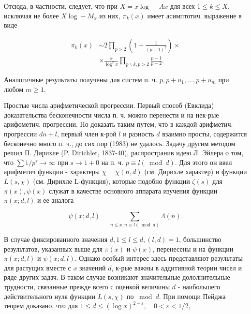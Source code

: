 \documentclass[10pt]{article}
\begin{document}
Отсюда, в частности, следует, что при $X=x \log -A x$ для всех $1 \leqslant k \leqslant X$, исключая не более $X \log -M_{x}$ из них, $\pi_{k}(x)$ имеет асимптотич. выражение в виде



\[

\begin{aligned}

\pi_{k}(x) & \sim 2 \prod_{p>2}\left(1-\frac{1}{(p-1)^{2}}\right) \times \\

& \times \frac{x}{\log ^{2} x} \prod_{p \backslash k, p>2} \frac{p-1}{p-2} .

\end{aligned}

\]



Аналогичные результаты получены для систем п. ч. $p, p+u_{1}, \ldots, p+u_{m}$ при любом $m \geqslant 1$.



Простые числа арифметической прогрессии. Первый способ (Евклида) доказательства бесконечности числа п. ч. можно перенести и на нек-рые арифометич. прогрессии. Но доказать таким путем, что в каждой арифметич. прогрессии $d n+l$, первый член к-рой $l$ и разность $d$ взаимно просты, содержится бесконечно много п. ч., до сих пор (1983) не удалось. Задачу другим методом решил П. Дирихле (P. Dirichlet, 1837-40), распространив идею Л. Эйлера о том, что $\sum 1 / p^{s} \rightarrow \infty$ при $s \rightarrow 1+0$ на п. ч. $p \equiv l(\bmod d)$. Для этого он ввел арифметич функции - характеры $\chi=\chi(n, d)$ (см. Дирихле характер) и функции $L(s, \chi)$ (см. Дирихле L-функция), которые подобно функции $\zeta(s)$ для $\pi(x), \psi(x)$ служат в качестве основного аппарата изучения функции $\pi(x ; d, l)$ и ее аналога



\[

\psi(x ; d, l)=\sum_{n \leqslant x, n \equiv l(\bmod d)} \Lambda(n) .

\]



В случае фиксированного значения $d, 1 \leqslant l \leqslant d,(l, d)=1$, большинство результатов, указанных выше для $\pi(x)$ и $\psi(x)$, перенесены и на функции $\pi(x ; d, l)$ и $\psi(x ; d, l)$. Однако особый интерес здесь представляют результаты для растущих вместе с $x$ значений $d$, к-рые важны в аддитивной теории чисел и ряде других задач. В таком случае возникают значительные дололнительные трудности, связанные прежде всего с оценкой величины $d$ - наибольшего действительного нуля функции $L(s, \chi)$ по $\bmod d$. При помощи Пейджа теорем доказано, что для $1 \leqslant d \leqslant(\log x)^{2-\varepsilon}, \quad 0<\varepsilon<1 / 2$,
\end{document}
